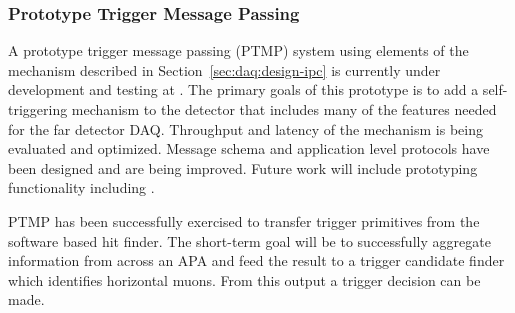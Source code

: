 \subsubsection{Prototype Trigger Message Passing}

A prototype trigger message passing (PTMP) system using elements of the  mechanism described in Section~\ref{sec:daq:design-ipc} is currently under development and testing at .
The primary goals of this prototype is to add a self-triggering mechanism to the  detector that includes many of the features needed for the far detector DAQ.
Throughput and latency of the mechanism is being evaluated and optimized.
Message schema and application level protocols have been designed and are being improved.
Future work will include prototyping  functionality including .

PTMP has been successfully exercised to transfer trigger primitives from the software based hit finder. The short-term goal will be to successfully aggregate information from across an APA and feed the result to a trigger candidate finder which identifies horizontal muons. From this output a trigger decision can be made.




